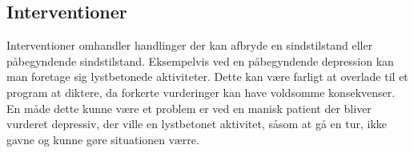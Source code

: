 \subsection{Interventioner}
Interventioner omhandler handlinger der kan afbryde en sindstilstand eller påbegyndende sindstilstand.
Eksempelvis ved en påbegyndende depression kan man foretage sig lystbetonede aktiviteter.
Dette kan være farligt at overlade til et program at diktere, da forkerte vurderinger kan have voldsomme konsekvenser.
En måde dette kunne være et problem er ved en manisk patient der bliver vurderet depressiv, der ville en lystbetonet aktivitet, såsom at gå en tur, ikke gavne og kunne gøre situationen værre.
